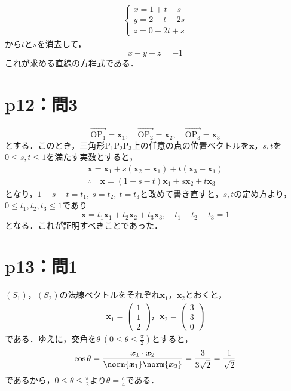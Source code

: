 \begin{tanswer}
  \begin{align*}
    \begin{cases}
      x=1+t-s   \\
      y=2-t -2s \\
      z=0+2t+s
    \end{cases}
  \end{align*}
  から$t$と$s$を消去して，
  \[
    x-y-z=-1
  \]
  これが求める直線の方程式である．
\end{tanswer}

\section*{p12：問3}

\begin{tproof}
  \[
    \overrightarrow{\mathrm{OP_1}}=\bm{x}_1,\quad \overrightarrow{\mathrm{OP_2}}=\bm{x}_2,\quad \overrightarrow{\mathrm{OP_3}}=\bm{x}_3
  \]
  とする．このとき，三角形$\mathrm{P_1 P_2 P_3}$上の任意の点の位置ベクトルを$\bm{x}$，$s,t$を$0 \le s,t \le 1$を満たす実数とすると，
  \begin{gather*}
    \bm{x}=\bm{x}_1 + s(\bm{x}_2 - \bm{x}_1) + t (\bm{x}_3 - \bm{x}_1) \\
    \therefore \quad \bm{x} = (1-s-t)\bm{x}_1 + s\bm{x}_2 + t \bm{x}_3
  \end{gather*}
  となり，$1-s-t=t_1,~s=t_2,~t=t_3$と改めて書き直すと，$s,t$の定め方より，$0 \le t_1 ,t_2,t_3 \le 1$であり
  \[
    \bm{x} = t_1\bm{x}_1 + t_2\bm{x}_2 + t_3 \bm{x}_3,\quad t_1+t_2+t_3=1
  \]
  となる．これが証明すべきことであった．
\end{tproof}
%

%
\section*{p13：問1}
%
\begin{tanswer}
  $(S_1)$，$(S_2)$の法線ベクトルをそれぞれ$\bm{x}_1$，$\bm{x}_2$とおくと，
  \begin{gather*}
    \bm{x}_1 =
    \begin{pmatrix}
      1 \\
      1 \\
      2
    \end{pmatrix}
    ，
    \bm{x}_2 =
    \begin{pmatrix}
      3 \\
      3 \\
      0
    \end{pmatrix}
  \end{gather*}
  である．ゆえに，交角を$\theta ~(0 \le \theta \le \frac{\pi}{2})$とすると，
  \[
    \cos \theta = \frac{\bm{x}_1 \cdot \bm{x}_2}{\norm{\bm{x}_1} \norm{\bm{x}_2}}=\frac{3}{3\sqrt{2}}=\frac{1}{\sqrt{2}}
  \]
  であるから，$0 \le \theta \le \frac{\pi}{2}$より$\theta =\frac{\pi}{4}$である．
\end{tanswer}
%
